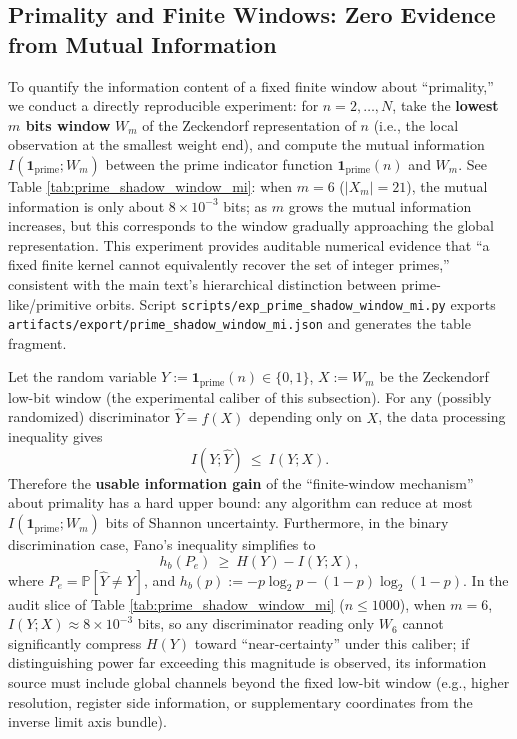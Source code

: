 \subsection{Primality and Finite Windows: Zero Evidence from Mutual Information}\label{subsec:prime-shadow-window-mi}
To quantify the information content of a fixed finite window about ``primality,'' we conduct a directly reproducible experiment: for $n=2,\dots,N$, take the \textbf{lowest $m$ bits window} $W_m$ of the Zeckendorf representation of $n$ (i.e., the local observation at the smallest weight end), and compute the mutual information
\(
I(\mathbf{1}_{\mathrm{prime}};W_m)
\)
between the prime indicator function $\mathbf{1}_{\mathrm{prime}}(n)$ and $W_m$.
See Table \ref{tab:prime_shadow_window_mi}: when $m=6$ ($|X_m|=21$), the mutual information is only about $8\times 10^{-3}$ bits; as $m$ grows the mutual information increases, but this corresponds to the window gradually approaching the global representation. This experiment provides auditable numerical evidence that ``a fixed finite kernel cannot equivalently recover the set of integer primes,'' consistent with the main text's hierarchical distinction between prime-like/primitive orbits. Script \texttt{scripts/exp\_prime\_shadow\_window\_mi.py} exports \texttt{artifacts/export/prime\_shadow\_window\_mi.json} and generates the table fragment.



\begin{remark}\label{rem:prime-shadow-window-mi-algorithmic-lb}
Let the random variable \(Y:=\mathbf{1}_{\mathrm{prime}}(n)\in\{0,1\}\), \(X:=W_m\) be the Zeckendorf low-bit window (the experimental caliber of this subsection).
For any (possibly randomized) discriminator \(\widehat Y=f(X)\) depending only on \(X\), the data processing inequality gives
\[
I(Y;\widehat Y)\ \le\ I(Y;X).
\]
Therefore the \textbf{usable information gain} of the ``finite-window mechanism'' about primality has a hard upper bound: any algorithm can reduce at most
\(
I(\mathbf{1}_{\mathrm{prime}};W_m)
\)
bits of Shannon uncertainty.
Furthermore, in the binary discrimination case, Fano's inequality simplifies to
\[
h_b(P_e)\ \ge\ H(Y)-I(Y;X),
\]
where \(P_e=\mathbb{P}[\widehat Y\neq Y]\), and \(h_b(p):=-p\log_2 p-(1-p)\log_2(1-p)\).
In the audit slice of Table \ref{tab:prime_shadow_window_mi} (\(n\le 1000\)), when \(m=6\), \(I(Y;X)\approx 8\times 10^{-3}\) bits,
so any discriminator reading only \(W_6\) cannot significantly compress \(H(Y)\) toward ``near-certainty'' under this caliber;
if distinguishing power far exceeding this magnitude is observed, its information source must include global channels beyond the fixed low-bit window (e.g., higher resolution, register side information, or supplementary coordinates from the inverse limit axis bundle).
\end{remark}

